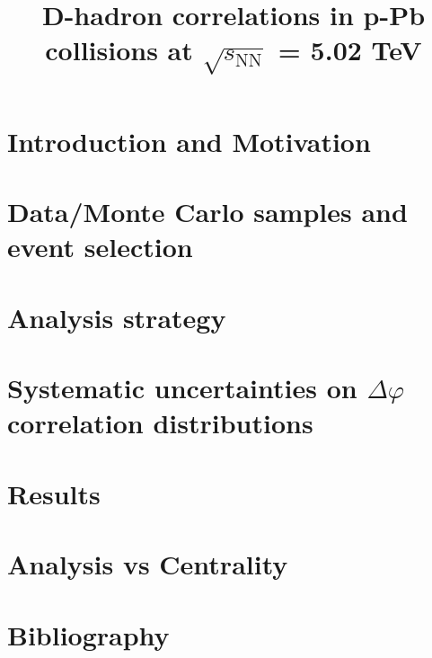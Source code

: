 \documentclass[ALICE,manyauthors]{cernphprep}
\begin{document}
\begin{titlepage}


\PHdate{\today}              %

\title{D-hadron correlations  in p-Pb collisions at $\sqrt{s_\mathrm{NN}}$ = 5.02 TeV}

%




\end{titlepage}

\linenumbers
\tableofcontents

\newpage
\section{Introduction and Motivation}


\newpage
\section{Data/Monte Carlo samples and event selection}


\newpage
\section{Analysis strategy}


\newpage
\section{Systematic uncertainties on $\Delta\varphi$ correlation distributions}


\newpage
\section{Results}


\newpage
\section{Analysis vs Centrality}


%

%

\newpage
\section{Bibliography}

\end{document}
